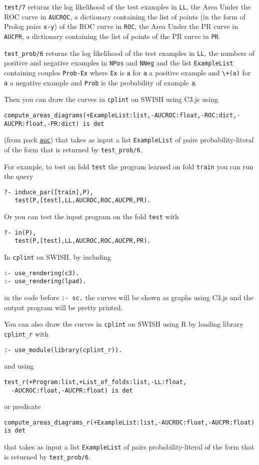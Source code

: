 \verb|test/7| returns the log likelihood of the test examples in \verb|LL|, the Area Under the ROC curve in \verb|AUCROC|, a dictionary containing the list of points (in the form of Prolog pairs \verb|x-y|) of the ROC curve in \verb|ROC|,
the Area Under the PR curve in \verb|AUCPR|, a dictionary containing the list of points of the PR curve in \verb|PR|.

\verb|test_prob/6| returns the log likelihood of the test examples in \verb|LL|, the numbers of positive and negative examples in \verb|NPos| and \verb|NNeg| and the list 
\verb|ExampleList| containing couples \verb|Prob-Ex| where \verb|Ex| is \verb|a| for \verb|a| a positive example and \verb|\+(a)| for \verb|a| a negative example
and \verb|Prob| is the probability of example \verb|a|.

Then you can draw the curves in \texttt{cplint}  on SWISH using C3.js using
\begin{verbatim}
compute_areas_diagrams(+ExampleList:list,-AUCROC:float,-ROC:dict,-AUCPR:float,-PR:dict) is det
\end{verbatim}
(from pack \href{http://www.swi-prolog.org/pack/list?p=auc}{\texttt{auc}})
that takes as input a list \verb|ExampleList| of pairs probability-literal of the form that is returned by
\verb|test_prob/6|.

For example, to test on fold \verb|test| the program learned on fold \verb|train| you can run the query
\begin{verbatim}
?- induce_par([train],P),
   test(P,[test],LL,AUCROC,ROC,AUCPR,PR).
\end{verbatim}
Or you can test the input program on the fold \verb|test| with
\begin{verbatim}
?- in(P),
   test(P,[test],LL,AUCROC,ROC,AUCPR,PR).
\end{verbatim}
In \verb|cplint| on SWISH, by including
\begin{verbatim}
:- use_rendering(c3).
:- use_rendering(lpad).
\end{verbatim}
in the code before \verb|:- sc.| the curves will be shown as graphs using C3.js and the output program will be pretty printed.

You can also draw the curves in \texttt{cplint}  on SWISH using R by loading library
\texttt{cplint\_r}  with
\begin{verbatim}
:- use_module(library(cplint_r)).
\end{verbatim}
and using 
\begin{verbatim}
test_r(+Program:list,+List_of_folds:list,-LL:float,
  -AUCROC:float,-AUCPR:float) is det
\end{verbatim}
or predicate
\begin{verbatim}
compute_areas_diagrams_r(+ExampleList:list,-AUCROC:float,-AUCPR:float) is det
\end{verbatim}
that takes as input a list \verb|ExampleList| of pairs probability-literal of the form that is returned by
\verb|test_prob/6|.

